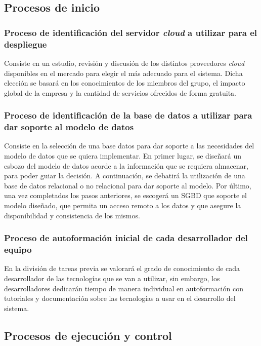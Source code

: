 \documentclass{article}
\begin{document}
\subsection{Procesos de inicio}

\subsubsection{Proceso de identificación del servidor \textit{cloud} a utilizar para el despliegue} \label{P.I.1}
Consiste en un estudio, revisión y discusión de los distintos proveedores \textit{cloud} disponibles en el mercado para elegir el más adecuado para el sistema. Dicha elección se basará en los conocimientos de los miembros del grupo, el impacto global de la empresa y la cantidad de servicios ofrecidos de forma gratuita.

\subsubsection{Proceso de identificación de la base de datos a utilizar para dar soporte al modelo de datos} \label{P.I.2}
Consiste en la selección de una base datos para dar soporte a las necesidades del modelo de datos que se quiera implementar. En primer lugar, se diseñará un esbozo del modelo de datos acorde a la información que se requiera almacenar, para poder guiar la decisión. A continuación, se debatirá la utilización de una base de datos relacional o no relacional para dar soporte al modelo. Por último, una vez completados los pasos anteriores, se escogerá un SGBD que soporte el modelo diseñado, que permita un acceso remoto a los datos y que asegure la disponibilidad y consistencia de los mismos.

\subsubsection{Proceso de autoformación inicial de cada desarrollador del equipo} \label{P.I.3}
En la división de tareas previa se valorará el grado de conocimiento de cada desarrollador de las tecnologías que se van a utilizar, sin embargo, los desarrolladores dedicarán tiempo de manera individual en autoformación con tutoriales y documentación sobre las tecnologías a usar en el desarrollo del sistema.

\subsection{Procesos de ejecución y control}
\end{document}
